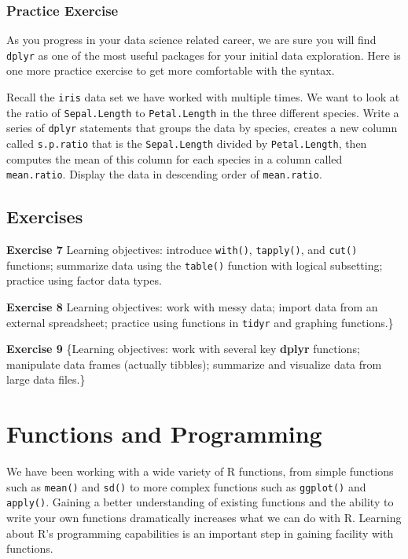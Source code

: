 \documentclass[]{krantz}
\begin{document}
\subsection{Practice Exercise}\label{practice-exercise-10}

As you progress in your data science related career, we are sure you
will find \texttt{dplyr} as one of the most useful packages for your
initial data exploration. Here is one more practice exercise to get more
comfortable with the syntax.

Recall the \texttt{iris} data set we have worked with multiple times. We
want to look at the ratio of \texttt{Sepal.Length} to
\texttt{Petal.Length} in the three different species. Write a series of
\texttt{dplyr} statements that groups the data by species, creates a new
column called \texttt{s.p.ratio} that is the \texttt{Sepal.Length}
divided by \texttt{Petal.Length}, then computes the mean of this column
for each species in a column called \texttt{mean.ratio}. Display the
data in descending order of \texttt{mean.ratio}.

\section{Exercises}\label{exercises-3}

\textbf{Exercise 7} Learning objectives: introduce \texttt{with()},
\texttt{tapply()}, and \texttt{cut()} functions; summarize data using
the \texttt{table()} function with logical subsetting; practice using
factor data types.

\textbf{Exercise 8} Learning objectives: work with messy data; import
data from an external spreadsheet; practice using functions in
\texttt{tidyr} and graphing functions.\}

\textbf{Exercise 9} \{Learning objectives: work with several key
\textbf{dplyr} functions; manipulate data frames (actually tibbles);
summarize and visualize data from large data files.\}

\chapter{Functions and Programming}\label{functions}

We have been working with a wide variety of R functions, from simple
functions such as \texttt{mean()} and \texttt{sd()} to more complex
functions such as \texttt{ggplot()} and \texttt{apply()}. Gaining a
better understanding of existing functions and the ability to write your
own functions dramatically increases what we can do with R. Learning
about R's programming capabilities is an important step in gaining
facility with functions.
\end{document}
